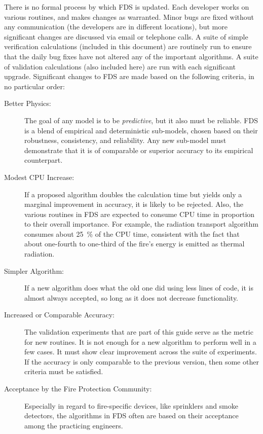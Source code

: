 \documentclass[11pt]{book}
\begin{document}
There is no formal process by which FDS is updated. Each developer works on various routines, and makes changes as warranted. Minor bugs are fixed
without any communication (the developers are in different locations), but more significant changes are discussed via email or telephone calls. A
suite of simple verification calculations (included in this document) are routinely run to ensure that the daily bug fixes have not altered any of
the important algorithms. A suite of validation calculations (also included here) are run with each significant upgrade. Significant changes to FDS
are made based on the following criteria, in no particular order:
\begin{description}
\item[Better Physics:] The goal of any model is to be {\em predictive}, but it also must be reliable. FDS is a blend of empirical and
deterministic sub-models, chosen based on their robustness, consistency, and reliability. Any new sub-model must demonstrate that it is of comparable
or superior accuracy to its empirical counterpart.
\item[Modest CPU Increase:] If a proposed algorithm doubles the calculation time but yields only a marginal improvement in accuracy, it is
likely to be rejected. Also, the various routines in FDS are expected to consume CPU time in proportion to their overall importance. For example, the
radiation transport algorithm consumes about 25~\% of the CPU time, consistent with the fact that about one-fourth to one-third of the fire's energy
is emitted as thermal radiation.
\item[Simpler Algorithm:] If a new algorithm does what the old one did using less lines of code, it is almost always accepted, so long as
it does not decrease functionality.
\item[Increased or Comparable Accuracy:] The validation experiments that are part of this guide serve as the metric for new routines. It is
not enough for a new algorithm to perform well in a few cases. It must show clear improvement across the suite of experiments. If the accuracy is
only comparable to the previous version, then some other criteria must be satisfied.
\item[Acceptance by the Fire Protection Community:] Especially in regard to fire-specific devices, like sprinklers and smoke detectors, the
algorithms in FDS often are based on their acceptance among the practicing engineers.
\end{description}
\end{document}
